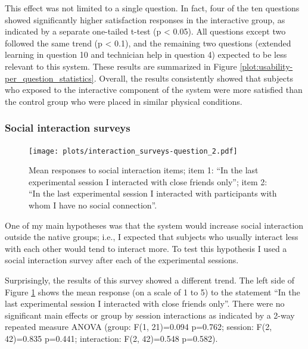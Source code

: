 \documentclass[a4paper,11pt]{article}
\begin{document}
{This effect was not limited to a single question.
In fact, four of the ten questions showed significantly higher satisfaction responses in the interactive group, as indicated by a separate one-tailed t-test (p \textless{} 0.05).
All questions except two followed the same trend (p \textless{} 0.1), and the remaining two questions (extended learning in question 10 and technician help in question 4) expected to be less relevant to this system.
These results are summarized in Figure \ref{plot:usability-per_question_statistics}.
Overall, the results consistently showed that subjects who exposed to the interactive component of the system were more satisfied than the control group who were placed in similar physical conditions.

\subsubsection{Social interaction surveys}

\begin{figure}[!htb]
    \centering
    \texttt{[image: plots/interaction\_surveys-question\_2.pdf]}
    \caption{Mean responses to social interaction items; item 1: ``In the last experimental session I interacted with close friends only''; item 2: ``In the last experimental session I interacted with participants with whom I have no social connection''.}\label{plot:interaction_surveys-question_2}
\end{figure}

One of my main hypotheses was that the system would increase social interaction outside the native groups;
i.e., I expected that subjects who usually interact less with each other would tend to interact more.
To test this hypothesis I used a social interaction survey after each of the experimental sessions.

Surprisingly, the results of this survey showed a different trend.
The left side of Figure \ref{plot:interaction_surveys-question_2} shows the mean response (on a scale of 1 to 5) to the statement ``In the last experimental session I interacted with close friends only''.
There were no significant main effects or group by session interactions as indicated by a 2-way repeated measure ANOVA (group: F(1, 21)=0.094 p=0.762; session: F(2, 42)=0.835 p=0.441; interaction: F(2, 42)=0.548 p=0.582).

}
\end{document}
